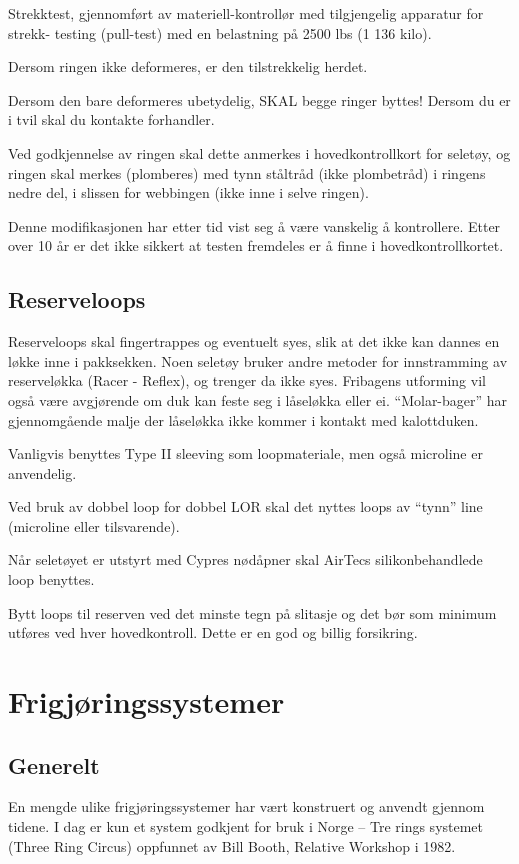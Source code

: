 Strekktest, gjennomført av materiell-kontrollør med tilgjengelig apparatur for strekk- testing (pull-test) med en belastning på 2500 lbs (1 136 kilo).

Dersom ringen ikke deformeres, er den tilstrekkelig herdet.

Dersom den bare deformeres ubetydelig, SKAL begge ringer byttes! Dersom du er i tvil skal du kontakte forhandler.

Ved godkjennelse av ringen skal dette anmerkes i hovedkontrollkort for seletøy, og ringen skal merkes (plomberes) med tynn ståltråd (ikke plombetråd) i ringens nedre del, i slissen for webbingen (ikke inne i selve ringen).

Denne modifikasjonen har etter tid vist seg å være vanskelig å kontrollere. Etter over 10 år er det ikke sikkert at testen fremdeles er å finne i hovedkontrollkortet.

\subsection{Reserveloops}
Reserveloops skal fingertrappes og eventuelt syes, slik at det ikke kan dannes en løkke inne i pakksekken. Noen seletøy bruker andre metoder for innstramming av reserveløkka (Racer - Reflex), og trenger da ikke syes. Fribagens utforming vil også være avgjørende om duk kan feste seg i låseløkka eller ei. ``Molar-bager'' har gjennomgående malje der låseløkka ikke kommer i kontakt med kalottduken.

Vanligvis benyttes Type II sleeving som loopmateriale, men også microline er anvendelig.

Ved bruk av dobbel loop for dobbel LOR skal det nyttes loops av ``tynn'' line (microline eller tilsvarende).

Når seletøyet er utstyrt med Cypres nødåpner skal AirTecs silikonbehandlede loop benyttes.

Bytt loops til reserven ved det minste tegn på slitasje og det bør som minimum utføres ved hver hovedkontroll. Dette er en god og billig forsikring.

\section{Frigjøringssystemer}
\subsection{Generelt}
En mengde ulike frigjøringssystemer har vært konstruert og anvendt gjennom tidene. I dag er kun et system godkjent for bruk i Norge – Tre rings systemet (Three Ring Circus) oppfunnet av Bill Booth, Relative Workshop i 1982.

